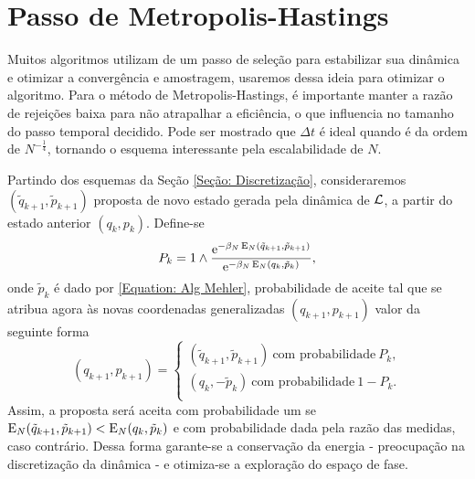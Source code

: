 \section{Passo de Metropolis-Hastings}
\label{Section: Metropolis}

Muitos algoritmos utilizam de um passo de seleção para estabilizar sua dinâmica e otimizar a convergência e amostragem, usaremos dessa ideia para otimizar o algoritmo. Para o método de Metropolis-Hastings, é importante manter a razão de rejeições baixa para não atrapalhar a eficiência, o que influencia no tamanho do passo temporal decidido. Pode ser mostrado que $\Delta t$ é ideal quando é da ordem de $N^{-\frac{1}{4}}$, \cite{Chafa2018} tornando o esquema interessante pela escalabilidade de $N$.

Partindo dos esquemas da Seção \ref{Seção: Discretização}, consideraremos $(\tilde{q}_{k+1},\tilde{p}_{k+1})$ proposta de novo estado gerada pela dinâmica de $\operatorname{\mathcal{L}}$, a partir do estado anterior $(q_{k},p_{k})$. Define-se
\begin{equation}
P_k = 1 \wedge \frac{\operatorname{e}^{-\beta_N \operatorname{E}_N(\tilde{q}_{k+1}, \tilde{p}_{k+1})}}{\operatorname{e}^{-\beta_N \operatorname{E}_N(q_{k}, \tilde{p}_{k})}},
\label{Equation: Pk}
\end{equation}
onde $\tilde{p}_{k}$ é dado por \eqref{Equation: Alg Mehler}, probabilidade de aceite tal que se atribua agora às novas coordenadas generalizadas $(q_{k+1}, p_{k+1})$ valor da seguinte forma
\begin{equation}
	(q_{k+1}, p_{k+1}) =
\begin{cases}
	(\tilde{q}_{k+1}, \tilde{p}_{k+1}) \ \text{com probabilidade} \ P_k, \\
	(q_k, -\tilde{p}_{k}) \ \text{com probabilidade} \ 1-P_k. \\
\end{cases}
\label{Equation: Metropolis}
\end{equation}
Assim, a proposta será aceita com probabilidade um se $\operatorname{E}_N(\tilde{q}_{k+1}, \tilde{p}_{k+1}) < \operatorname{E}_N(q_{k}, \tilde{p}_{k})$ e com probabilidade dada pela razão das medidas, caso contrário. Dessa forma garante-se a conservação da energia - preocupação na discretização da dinâmica - e otimiza-se a exploração do espaço de fase.